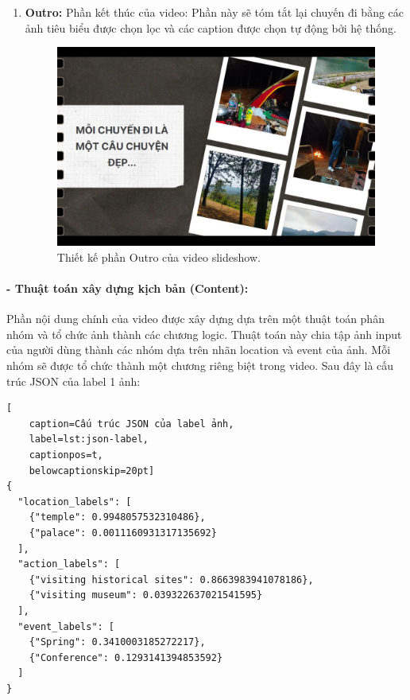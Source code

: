 \begin{enumerate}
    \item \textbf{Outro:} Phần kết thúc của video: Phần này sẽ tóm tắt lại chuyến đi bằng các ảnh tiêu biểu được chọn lọc và các caption được chọn tự động bởi hệ thống.
    
    \begin{figure}[H]
        \centering  
        \includegraphics[width=1\textwidth]{figures/c4/4_1/outro.jpg}
        \caption{Thiết kế phần Outro của video slideshow.}
        \label{fig:video-outro-design}
    \end{figure}
\end{enumerate}

\paragraph{- Thuật toán xây dựng kịch bản (Content):}
Phần nội dung chính của video được xây dựng dựa trên một thuật toán phân nhóm và tổ chức ảnh thành các chương logic. Thuật toán này chia tập ảnh input của người dùng thành các nhóm dựa trên nhãn location và event của ảnh. Mỗi nhóm sẽ được tổ chức thành một chương riêng biệt trong video. Sau đây là cấu trúc JSON của label 1 ảnh:

\lstset{language=json}
\begin{lstlisting}[
    caption=Cấu trúc JSON của label ảnh,
    label=lst:json-label,
    captionpos=t,
    belowcaptionskip=20pt]
{
  "location_labels": [
    {"temple": 0.9948057532310486},
    {"palace": 0.0011160931317135692}
  ],
  "action_labels": [
    {"visiting historical sites": 0.8663983941078186},
    {"visiting museum": 0.039322637021541595}
  ],
  "event_labels": [
    {"Spring": 0.3410003185272217},
    {"Conference": 0.1293141394853592}
  ]
}
\end{lstlisting}

